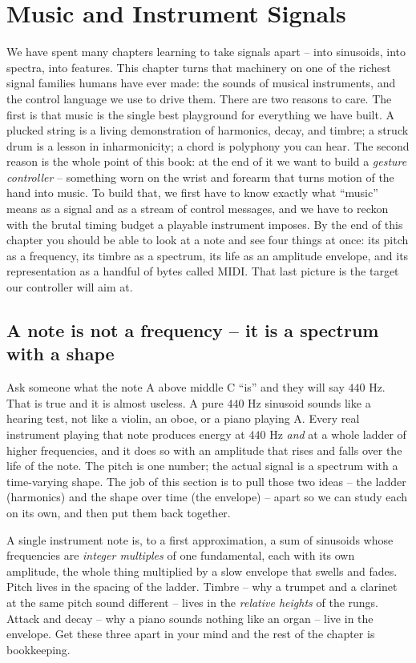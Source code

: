 \chapter{Music and Instrument Signals}

We have spent many chapters learning to take signals apart -- into sinusoids, into spectra, into
features. This chapter turns that machinery on one of the richest signal families humans have ever
made: the sounds of musical instruments, and the control language we use to drive them. There are
two reasons to care. The first is that music is the single best playground for everything we have
built. A plucked string is a living demonstration of harmonics, decay, and timbre; a struck drum is
a lesson in inharmonicity; a chord is polyphony you can hear. The second reason is the whole point of
this book: at the end of it we want to build a \emph{gesture controller} -- something worn on the
wrist and forearm that turns motion of the hand into music. To build that, we first have to know
exactly what ``music'' means as a signal and as a stream of control messages, and we have to reckon
with the brutal timing budget a playable instrument imposes. By the end of this chapter you
should be able to look at a note and see four things at once: its pitch as a frequency, its timbre as
a spectrum, its life as an amplitude envelope, and its representation as a handful of bytes called
MIDI. That last picture is the target our controller will aim at.

\section{A note is not a frequency -- it is a spectrum with a shape}
\label{ch29:note-is-spectrum}

Ask someone what the note A above middle C ``is'' and they will say $440$ Hz. That is true and it is
almost useless. A pure $440$ Hz sinusoid sounds like a hearing test, not like a violin, an oboe, or a
piano playing A. Every real instrument playing that note produces energy at $440$ Hz \emph{and} at a
whole ladder of higher frequencies, and it does so with an amplitude that rises and falls over the
life of the note. The pitch is one number; the actual signal is a spectrum with a time-varying shape.
The job of this section is to pull those two ideas -- the ladder (harmonics) and the shape over time
(the envelope) -- apart so we can study each on its own, and then put them back together.

\begin{intuitionbox}
A single instrument note is, to a first approximation, a sum of sinusoids whose frequencies are
\emph{integer multiples} of one fundamental, each with its own amplitude, the whole thing multiplied
by a slow envelope that swells and fades. Pitch lives in the spacing of the ladder. Timbre -- why a
trumpet and a clarinet at the same pitch sound different -- lives in the \emph{relative heights} of
the rungs. Attack and decay -- why a piano sounds nothing like an organ -- live in the envelope. Get
these three apart in your mind and the rest of the chapter is bookkeeping.
\end{intuitionbox}


